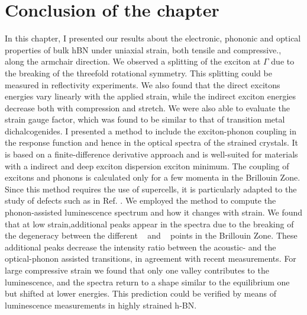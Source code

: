 %
\section*{Conclusion of the chapter}
In this chapter, I presented our results about the electronic, phononic and optical properties of bulk hBN under uniaxial strain, both tensile and compressive., along the armchair direction. We observed a splitting of the exciton at $\Gamma$ due to the breaking
of the threefold rotational symmetry. This splitting could be measured in reflectivity experiments.\cite{elias2021flat} We also found that the direct excitons energies vary linearly with the applied strain, while the indirect exciton energies decrease both with compression and stretch. We were also able to evaluate the strain gauge factor, which was found to be similar to that of transition metal dichalcogenides.
I presented a method to include the exciton-phonon coupling in the response function and hence in the optical spectra of the strained crystals. It is based on a finite-difference derivative approach and is well-suited for materials with a indirect and deep exciton dispersion exciton minimum. The coupling of excitons and phonons is calculated only for a few momenta in the Brillouin Zone. Since this method requires the use of supercells, it is particularly adapted to the study of defects such as in Ref. \cite{libbi2022phonon}. We employed the method to compute the phonon-assisted luminescence spectrum and how it changes with strain. We found that at low strain,additional peaks appear in the spectra due to the breaking of the degeneracy between the different \KK~ and \MM~ points in the Brillouin Zone. These additional peaks decrease the intensity ratio between the acoustic- and the optical-phonon assisted transitions, in agreement with recent measurements. For large compressive strain we found that only one valley contributes to the luminescence, and the spectra return to a shape similar to the equilibrium one but shifted at lower energies. This prediction could be verified by means of luminescence measurements in highly strained h-BN.\cite{blundo2022vibrational}